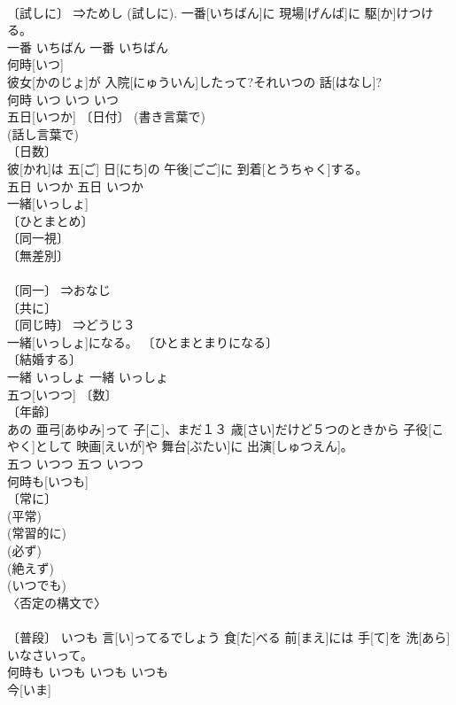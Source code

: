 \documentclass[8pt]{extreport}
\begin{document}
\begin{CJK}{UTF8}{min}
\\	〔試しに〕 ⇒ためし (試しに).	一番[いちばん]に 現場[げんば]に 駆[か]けつける。	
\\	一番	いちばん	一番	いちばん	
\\	何時[いつ]	
\\	[⇒いつなんどき]	彼女[かのじょ]が 入院[にゅういん]したって?それいつの 話[はなし]?	
\\	何時	いつ	いつ	いつ	
\\	五日[いつか]	〔日付〕 (書き言葉で) 
\\	(話し言葉で) 
\\	〔日数〕 
\\	彼[かれ]は 五[ご] 日[にち]の 午後[ごご]に 到着[とうちゃく]する。	
\\	五日	いつか	五日	いつか	
\\	一緒[いっしょ]	
\\	〔ひとまとめ〕 
\\	〔同一視〕 
\\	〔無差別〕 
\\	[⇒いっしょくた] 
\\	〔同一〕 ⇒おなじ 
\\	〔共に〕 
\\	〔同じ時〕 ⇒どうじ３ 
\\	一緒[いっしょ]になる。	〔ひとまとまりになる〕 
\\	〔結婚する〕 
\\	一緒	いっしょ	一緒	いっしょ	
\\	五つ[いつつ]	〔数〕 
\\	〔年齢〕 
\\	あの 亜弓[あゆみ]って 子[こ]、まだ１３ 歳[さい]だけど５つのときから 子役[こやく]として 映画[えいが]や 舞台[ぶたい]に 出演[しゅつえん]。	
\\	五つ	いつつ	五つ	いつつ	
\\	何時も[いつも]	
\\	〔常に〕 
\\	(平常) 
\\	(常習的に) 
\\	(必ず) 
\\	(絶えず) 
\\	(いつでも) 
\\	〈否定の構文で〉 
\\	[⇒いつでも] 
\\	〔普段〕	いつも 言[い]ってるでしょう 食[た]べる 前[まえ]には 手[て]を 洗[あら]いなさいって。	
\\	何時も	いつも	いつも	いつも	
\\	今[いま]	

\end{CJK}
\end{document}
